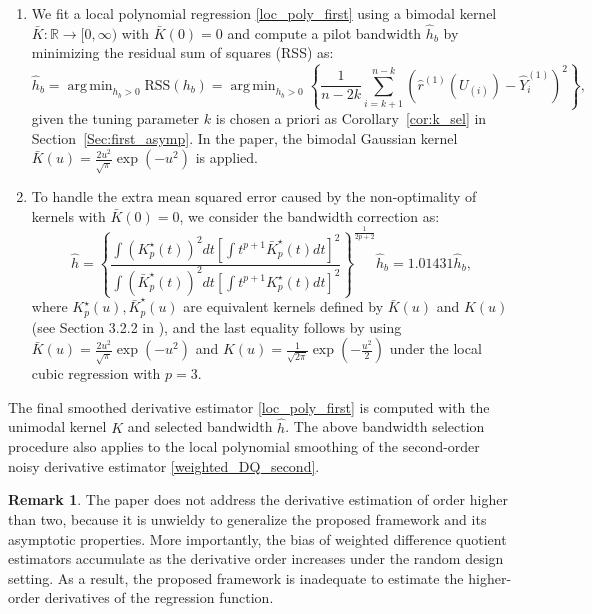 \documentclass{uwstat572}
\theoremstyle{definition}
\newtheorem{Remark}{Remark}
\DeclareMathOperator*{\argmin}{arg\,min}
\renewcommand{\hat}{\widehat}
\theoremstyle{theorem}
\begin{document}
\begin{enumerate}
	\item We fit a local polynomial regression \eqref{loc_poly_first} using a bimodal kernel $\bar{K}:\mathbb{R}\to [0,\infty)$ with $\bar{K}(0)=0$ and compute a pilot bandwidth $\hat{h}_b$ by minimizing the residual sum of squares (RSS) as:
	\begin{equation}
		\label{band_loc_pol}
		\hat{h}_b = \argmin_{h_b>0} \mathrm{RSS}(h_b) = \argmin_{h_b>0} \left\{\frac{1}{n-2k} \sum_{i=k+1}^{n-k} \left(\hat{r}^{(1)}(U_{(i)}) -\hat{Y}_i^{(1)} \right)^2 \right\},
	\end{equation} 
	given the tuning parameter $k$ is chosen a priori as Corollary~\ref{cor:k_sel} in Section~\ref{Sec:first_asymp}. In the paper, the bimodal Gaussian kernel $\bar{K}(u)=\frac{2u^2}{\sqrt{\pi}} \exp(-u^2)$ is applied.
	
	\item To handle the extra mean squared error caused by the non-optimality of kernels with $\bar{K}(0)=0$, we consider the bandwidth correction as:
	$$\hat{h} = \left\{\frac{\int \left(K_p^{\star}(t)\right)^2 dt \left[\int t^{p+1}\bar{K}_p^{\star}(t) dt \right]^2}{\int \left(\bar{K}_p^{\star}(t)\right)^2 dt \left[\int t^{p+1}K_p^{\star}(t) dt \right]^2}\right\}^{\frac{1}{2p+2}} \hat{h}_b = 1.01431 \hat{h}_b,$$
	where $K_p^{\star}(u), \bar{K}_p^{\star}(u)$ are equivalent kernels defined by $\bar{K}(u)$ and $K(u)$ (see Section 3.2.2 in \citealt{fan1996local}), and the last equality follows by using $\bar{K}(u)=\frac{2u^2}{\sqrt{\pi}} \exp(-u^2)$ and $K(u)=\frac{1}{\sqrt{2\pi}} \exp\left(-\frac{u^2}{2}\right)$ under the local cubic regression with $p=3$.  
\end{enumerate}
The final smoothed derivative estimator \eqref{loc_poly_first} is computed with the unimodal kernel $K$ and selected bandwidth $\hat{h}$. The above bandwidth selection procedure also applies to the local polynomial smoothing of the second-order noisy derivative estimator \eqref{weighted_DQ_second}.

\begin{Remark}
The paper does not address the derivative estimation of order higher than two, because it is unwieldy to generalize the proposed framework and its asymptotic properties. More importantly, the bias of weighted difference quotient estimators accumulate as the derivative order increases under the random design setting. As a result, the proposed framework is inadequate to estimate the higher-order derivatives of the regression function.
\end{Remark}
\end{document}
